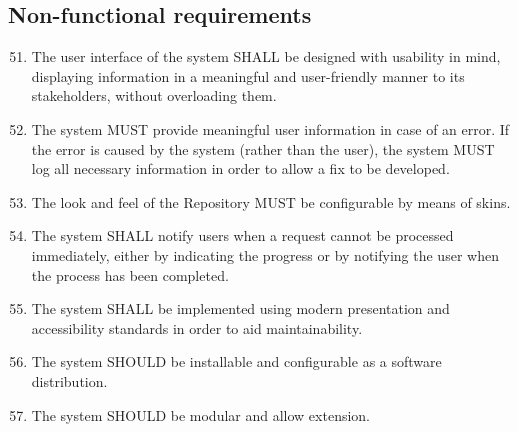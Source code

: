 \subsection{Non-functional requirements}
\label{nonFunctionalRequirements}
\begin{enumerate}[1]
\setcounter{enumi}{50}

\item The user interface of the system SHALL be designed with usability in mind, displaying information in a meaningful and user-friendly manner to its stakeholders, without overloading them.

\item The system MUST provide meaningful user information in case of an error. If the error is caused by the system (rather than the user), the system MUST log all necessary information in order to allow a fix to be developed.

\item The look and feel of the Repository MUST be configurable by means of skins.

\item The system SHALL notify users when a request cannot be processed immediately, either by indicating the progress or by notifying the user when the process has been completed.

\item The system SHALL be implemented using modern presentation and accessibility standards in order to aid maintainability.

\item The system SHOULD be installable and configurable as a software distribution.

\item The system SHOULD be modular and allow extension.
\end{enumerate}
